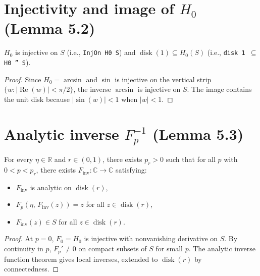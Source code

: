\chapter{Injectivity and image of \texorpdfstring{$H_0$}{H\_0} (Lemma 5.2)}

\begin{lemma}[Lemma 5.2]
  \label{lem:5_2}
  \leanok
  $H_0$ is injective on $S$ (i.e., \texttt{InjOn H0 S}) and $\operatorname{disk}(1) \subseteq H_0(S)$
  (i.e., \texttt{disk 1 $\subseteq$ H0 '' S}).
\end{lemma}

\begin{proof}
  \leanok
  Since $H_0 = \arcsin$ and $\sin$ is injective on the vertical strip
  $\{w : |\operatorname{Re}(w)| < \pi/2\}$, the inverse $\arcsin$ is
  injective on $S$. The image contains the unit disk because
  $|\sin(w)| < 1$ when $|w| < 1$.
\end{proof}

\chapter{Analytic inverse \texorpdfstring{$F_p^{-1}$}{F\_p\^{}-1} (Lemma 5.3)}

\begin{lemma}[Lemma 5.3]
  \label{lem:5_3}
  \leanok
  For every $\eta \in \mathbb{R}$ and $r \in (0,1)$, there exists $p_r > 0$ such that
  for all $p$ with $0 < p < p_r$, there exists $F_{\mathrm{inv}} : \mathbb{C} \to \mathbb{C}$
  satisfying:
  \begin{itemize}
    \item $F_{\mathrm{inv}}$ is analytic on $\operatorname{disk}(r)$,
    \item $F_p(\eta,\, F_{\mathrm{inv}}(z)) = z$ for all $z \in \operatorname{disk}(r)$,
    \item $F_{\mathrm{inv}}(z) \in S$ for all $z \in \operatorname{disk}(r)$.
  \end{itemize}
\end{lemma}

\begin{proof}
  \leanok
  At $p = 0$, $F_0 = H_0$ is injective with nonvanishing derivative on $S$.
  By continuity in $p$, $F_p' \neq 0$ on compact subsets of $S$ for small $p$.
  The analytic inverse function theorem gives local inverses, extended to
  $\operatorname{disk}(r)$ by connectedness.
\end{proof}

